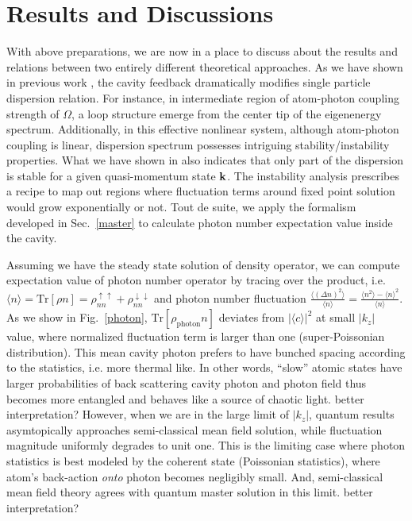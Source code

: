 \documentclass[atoms,article,submit,moreauthors,pdftex,12pt,a4paper]{mdpi}
\begin{document}
\section{Results and Discussions} \label{relation}

With above preparations, we are now in a place to discuss about the results and relations between two entirely different theoretical approaches. As we have shown in previous work \cite{cavitySOC}, the cavity feedback dramatically modifies single particle dispersion relation. For instance, in intermediate region of atom-photon coupling strength of $\Omega$, a loop structure emerge from the center tip of the eigenenergy spectrum. Additionally, in this effective nonlinear system, although atom-photon coupling is linear, dispersion spectrum possesses intriguing stability/instability properties. What we have shown in \cite{cavitySOC} also indicates that only part of the dispersion is stable for a given quasi-momentum state ${\bf k}$. The instability analysis prescribes a recipe to map out regions where fluctuation terms around fixed point solution would grow exponentially or not. Tout de suite, we apply the formalism developed in Sec.~\ref{master} to calculate photon number expectation value inside the cavity.

Assuming we have the steady state solution of density operator, we can compute expectation value of photon number operator by tracing over the product, i.e. $\langle n\rangle=\text{Tr}[\rho n]=\rho_{nn}^{\uparrow\uparrow}+\rho_{nn}^{\downarrow\downarrow}$ and  photon number fluctuation $\frac{\langle(\Delta n)^{2}\rangle}{\langle n\rangle}=\frac{\langle n^{2}\rangle-\langle n\rangle^{2}}{\langle n\rangle}$. As we show in Fig.~\ref{photon}, $\text{Tr}[\rho_\text{photon}n]$ deviates from $|\langle c\rangle|^2$ at small $|k_z|$ value, where normalized fluctuation term is larger than one (super-Poissonian distribution). This mean cavity photon prefers to have bunched spacing according to the statistics, i.e. more thermal like. In other words, ``slow'' atomic states have larger probabilities of back scattering cavity photon and photon field thus becomes more entangled and behaves like a source of chaotic light.
 {\color{red} better interpretation?} 
However, when we are in the large limit of  $|k_z|$, quantum results asymtopically approaches semi-classical mean field solution, while fluctuation magnitude uniformly degrades to unit one. This is the limiting case where photon statistics is best modeled by the coherent state (Poissonian statistics), where atom's back-action {\em onto} photon becomes negligibly small. And, semi-classical mean field theory agrees with quantum master solution in this limit. 
{\color{red} better interpretation?}
\end{document}

